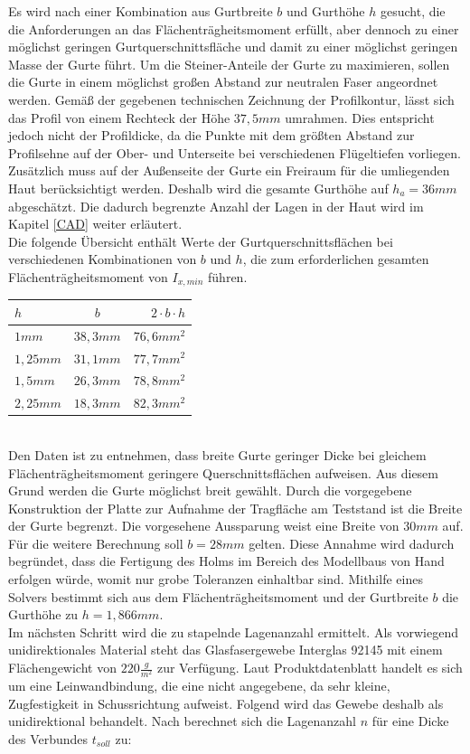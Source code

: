 \noindent Es wird nach einer Kombination aus Gurtbreite $ b $ und Gurthöhe $ h $ gesucht, die die Anforderungen an das Flächenträgheitsmoment erfüllt, aber dennoch zu einer möglichst geringen Gurtquerschnittsfläche und damit zu einer möglichst geringen Masse der Gurte führt. Um die Steiner-Anteile der Gurte zu maximieren, sollen die Gurte in einem möglichst großen Abstand zur neutralen Faser angeordnet werden. Gemäß der gegebenen technischen Zeichnung der Profilkontur, lässt sich das Profil von einem Rechteck der Höhe $ 37,5mm $ umrahmen. Dies entspricht jedoch nicht der Profildicke, da die Punkte mit dem größten Abstand zur Profilsehne auf der Ober- und Unterseite bei verschiedenen Flügeltiefen vorliegen. Zusätzlich muss auf der Außenseite der Gurte ein Freiraum für die umliegenden Haut berücksichtigt werden. Deshalb wird die gesamte Gurthöhe auf $ h_{a}=36mm $ abgeschätzt. Die dadurch begrenzte Anzahl der Lagen in der Haut wird im Kapitel \ref{CAD} weiter erläutert.\\ 

\noindent Die folgende Übersicht enthält Werte der Gurtquerschnittsflächen bei verschiedenen Kombinationen von $ b $ und $ h $, die zum erforderlichen gesamten Flächenträgheitsmoment von $ I_{x,min} $ führen.\\

		\begin{tabular}{l|c|r}
			$h$&$b$&$2\cdot b\cdot h$\\
			\hline
			$1mm$&$38,3mm$&$76,6mm^{2}$\\
			$1,25mm$&$31,1mm$&$77,7mm^{2}$\\
			$1,5mm$&$26,3mm$&$78,8mm^{2}$\\
			$2,25mm$&$18,3mm$&$82,3mm^{2}$\\
		\end{tabular}\\

\noindent Den Daten ist zu entnehmen, dass breite Gurte geringer Dicke bei gleichem Flächenträgheitsmoment geringere Querschnittsflächen aufweisen. Aus diesem Grund werden die Gurte möglichst breit gewählt. Durch die vorgegebene Konstruktion der Platte zur Aufnahme der Tragfläche am Teststand ist die Breite der Gurte begrenzt. Die vorgesehene Aussparung weist eine Breite von $ 30mm $ auf. Für die weitere Berechnung soll $ b=28mm $ gelten. Diese Annahme wird dadurch begründet, dass die Fertigung des Holms im Bereich des Modellbaus von Hand erfolgen würde, womit nur grobe Toleranzen einhaltbar sind.
Mithilfe eines Solvers bestimmt sich aus dem Flächenträgheitsmoment und der Gurtbreite $ b $ die Gurthöhe zu $ h=1,866mm $.\\
\noindent Im nächsten Schritt wird die zu stapelnde Lagenanzahl ermittelt. Als vorwiegend unidirektionales Material steht das Glasfasergewebe Interglas 92145 mit einem Flächengewicht von $ 220\frac{g}{m^{2}} $ zur Verfügung. Laut Produktdatenblatt \cite{item17} handelt es sich um eine Leinwandbindung, die eine nicht angegebene, da sehr kleine, Zugfestigkeit in Schussrichtung aufweist. Folgend wird das Gewebe deshalb als unidirektional behandelt. Nach \cite{item3} berechnet sich die Lagenanzahl $ n $ für eine Dicke des Verbundes $ t_{soll} $ zu:\\

